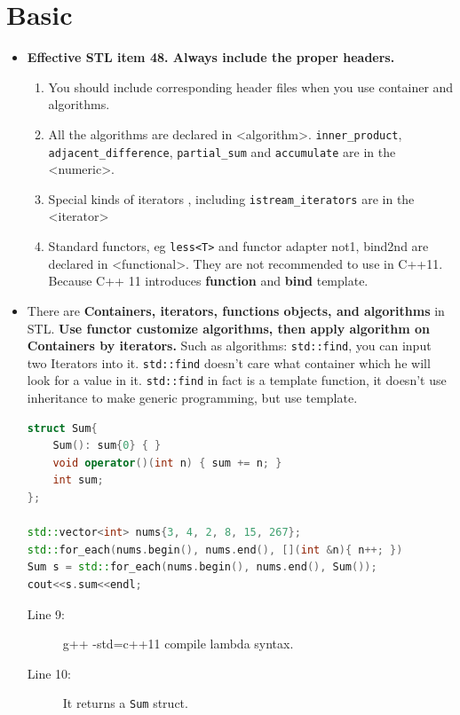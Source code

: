 \documentclass[a4paper,11pt,twoside]{book}
\begin{document}
\section{Basic}
\begin{itemize}
\item \textbf{Effective STL item 48. Always include the proper headers.}
\begin{enumerate}
\item You should include corresponding header files when you use container and algorithms.

\item All the algorithms are declared in <algorithm>. \texttt{inner\_product}, \texttt{adjacent\_difference}, \texttt{partial\_sum} and \texttt{accumulate} are in the <numeric>.

\item Special kinds of iterators , including \texttt{istream\_iterators} are in the <iterator>

\item Standard functors, eg \texttt{less<T>} and functor adapter not1, bind2nd are declared in <functional>. They are not recommended to use in C++11. Because C++ 11 introduces \textbf{function} and \textbf{bind} template.

\end{enumerate}

\item There are \textbf{Containers, iterators, functions objects, and algorithms} in STL. \textbf{Use functor customize algorithms, then apply algorithm on Containers by iterators.} Such as algorithms: \texttt{std::find}, you can input two Iterators into it.  \texttt{std::find} doesn't care what container which he will look for a value in it.  \texttt{std::find} in fact is a template function, it doesn't use inheritance to make generic programming, but use template.  

\begin{lstlisting}[frame=single, language=c++]
struct Sum{
    Sum(): sum{0} { }
    void operator()(int n) { sum += n; }
    int sum;
};

std::vector<int> nums{3, 4, 2, 8, 15, 267};
std::for_each(nums.begin(), nums.end(), [](int &n){ n++; })
Sum s = std::for_each(nums.begin(), nums.end(), Sum());
cout<<s.sum<<endl;
\end{lstlisting}

\begin{description}
	\item[Line 9:]  g++ -std=c++11 compile lambda syntax.
	\item[Line 10:] It returns a \texttt{Sum} struct.
\end{description}

\end{itemize}
\end{document}
